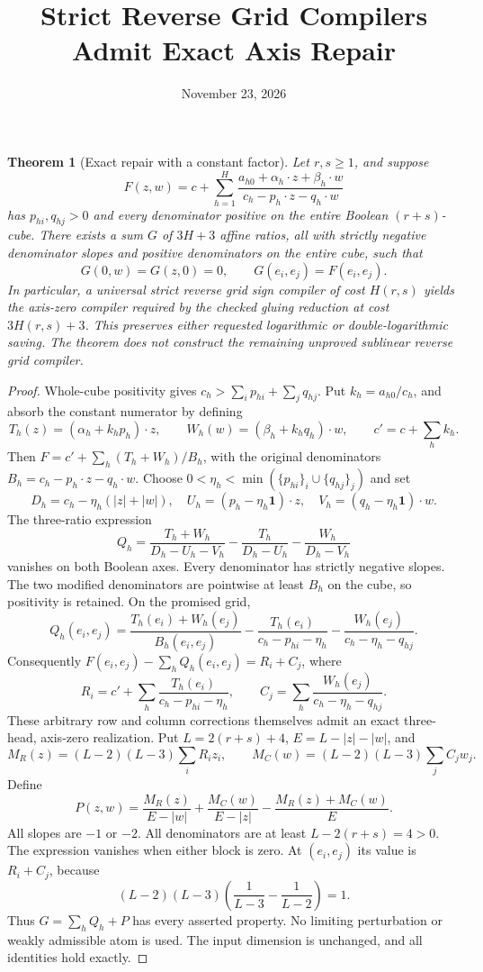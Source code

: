 \documentclass[11pt]{article}
\title{Strict Reverse Grid Compilers Admit Exact Axis Repair}
\author{}
\date{November 23, 2026}
\newtheorem{theorem}{Theorem}
\begin{document}
\maketitle

\begin{theorem}[Exact repair with a constant factor]
Let $r,s\geq1$, and suppose
\[
 F(z,w)=c+\sum_{h=1}^H
 \frac{a_{h0}+\alpha_h\cdot z+\beta_h\cdot w}
 {c_h-p_h\cdot z-q_h\cdot w}
\]
has $p_{hi},q_{hj}>0$ and every denominator positive on the entire
Boolean $(r+s)$-cube. There exists a sum $G$ of $3H+3$ affine ratios,
all with strictly negative denominator slopes and positive denominators
on the entire cube, such that
\[
 G(0,w)=G(z,0)=0,\qquad G(e_i,e_j)=F(e_i,e_j).
\]
In particular, a universal strict reverse grid sign compiler of cost
$H(r,s)$ yields the axis-zero compiler required by the checked gluing
reduction at cost $3H(r,s)+3$. This preserves either requested logarithmic
or double-logarithmic saving. The theorem does not construct the remaining
unproved sublinear reverse grid compiler.
\end{theorem}

\begin{proof}
Whole-cube positivity gives $c_h>\sum_i p_{hi}+\sum_j q_{hj}$.
Put $k_h=a_{h0}/c_h$, and absorb the constant numerator by defining
\[
 T_h(z)=(\alpha_h+k_hp_h)\cdot z,\qquad
 W_h(w)=(\beta_h+k_hq_h)\cdot w,\qquad
 c'=c+\sum_h k_h.
\]
Then $F=c'+\sum_h(T_h+W_h)/B_h$, with the original denominators
$B_h=c_h-p_h\cdot z-q_h\cdot w$.
Choose $0<\eta_h<\min(\{p_{hi}\}_i\cup\{q_{hj}\}_j)$ and set
\[
 D_h=c_h-\eta_h(|z|+|w|),\quad
 U_h=(p_h-\eta_h\mathbf1)\cdot z,\quad
 V_h=(q_h-\eta_h\mathbf1)\cdot w.
\]
The three-ratio expression
\[
 Q_h=\frac{T_h+W_h}{D_h-U_h-V_h}
       -\frac{T_h}{D_h-U_h}
       -\frac{W_h}{D_h-V_h}
\]
vanishes on both Boolean axes. Every denominator has strictly negative
slopes. The two modified denominators are pointwise at least $B_h$ on
the cube, so positivity is retained. On the promised grid,
\[
 Q_h(e_i,e_j)=\frac{T_h(e_i)+W_h(e_j)}{B_h(e_i,e_j)}
 -\frac{T_h(e_i)}{c_h-p_{hi}-\eta_h}
 -\frac{W_h(e_j)}{c_h-\eta_h-q_{hj}}.
\]
Consequently $F(e_i,e_j)-\sum_hQ_h(e_i,e_j)=R_i+C_j$, where
\[
 R_i=c'+\sum_h\frac{T_h(e_i)}{c_h-p_{hi}-\eta_h},\qquad
 C_j=\sum_h\frac{W_h(e_j)}{c_h-\eta_h-q_{hj}}.
\]
These arbitrary row and column corrections themselves admit an exact
three-head, axis-zero realization. Put $L=2(r+s)+4$,
$E=L-|z|-|w|$, and
\[
 M_R(z)=(L-2)(L-3)\sum_iR_iz_i,\qquad
 M_C(w)=(L-2)(L-3)\sum_jC_jw_j.
\]
Define
\[
 P(z,w)=\frac{M_R(z)}{E-|w|}
       +\frac{M_C(w)}{E-|z|}
       -\frac{M_R(z)+M_C(w)}{E}.
\]
All slopes are $-1$ or $-2$. All denominators are at least
$L-2(r+s)=4>0$. The expression vanishes when either block is zero.
At $(e_i,e_j)$ its value is $R_i+C_j$, because
\[
 (L-2)(L-3)\left(\frac1{L-3}-\frac1{L-2}\right)=1.
\]
Thus $G=\sum_hQ_h+P$ has every asserted property. No limiting
perturbation or weakly admissible atom is used. The input dimension is
unchanged, and all identities hold exactly.
\end{proof}
\end{document}
